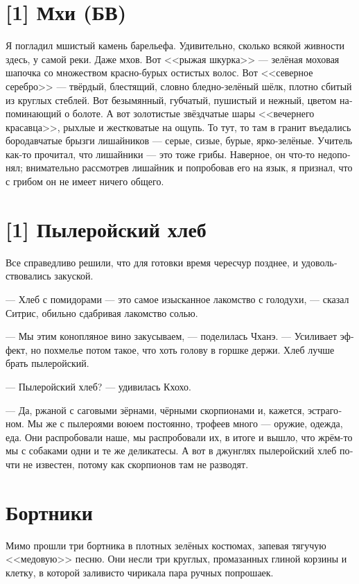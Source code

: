 \documentclass[a4paper,12pt,fleqn]{book}\usepackage{polyglossia}\setdefaultlanguage[babelshorthands=true]{russian}\setotherlanguage{english}\defaultfontfeatures{Ligatures=TeX,Mapping=tex-text}\usepackage{xcolor}\newcommand{\ml}[3]{#2}
\begin{document}
{\section{[1] Мхи (БВ)}

Я погладил мшистый камень барельефа.
Удивительно, сколько всякой живности здесь, у самой реки.
Даже мхов.
Вот <<рыжая шкурка>> --- зелёная моховая шапочка со множеством красно-бурых остистых волос.
Вот <<северное серебро>> --- твёрдый, блестящий, словно бледно-зелёный шёлк, плотно сбитый из круглых стеблей.
Вот безымянный, губчатый, пушистый и нежный, цветом напоминающий о болоте.
А вот золотистые звёздчатые шары <<вечернего красавца>>, рыхлые и жестковатые на ощупь.
То тут, то там в гранит въедались бородавчатые брызги лишайников --- серые, сизые, бурые, ярко-зелёные.
Учитель как-то прочитал, что лишайники --- это тоже грибы.
Наверное, он что-то недопонял;
внимательно рассмотрев лишайник и попробовав его на язык, я признал, что с грибом он не имеет ничего общего.

\section{[1] Пылеройский хлеб}

Все справедливо решили, что для готовки время чересчур позднее, и удовольствовались закуской.

--- Хлеб с помидорами --- это самое изысканное лакомство с голодухи, --- сказал Ситрис, обильно сдабривая лакомство солью.

--- Мы этим конопляное вино закусываем, --- поделилась Чханэ.
--- Усиливает эффект, но похмелье потом такое, что хоть голову в горшке держи.
Хлеб лучше брать пылеройский.

--- Пылеройский хлеб? --- удивилась Кхохо.

--- Да, ржаной с саговыми зёрнами, чёрными скорпионами и, кажется, эстрагоном.
Мы же с пылероями воюем постоянно, трофеев много --- оружие, одежда, еда.
Они распробовали наше, мы распробовали их, в итоге и вышло, что жрём-то мы с собаками одни и те же деликатесы.
А вот в джунглях пылеройский хлеб почти не известен, потому как скорпионов там не разводят.

\section{Бортники}

Мимо прошли три бортника в плотных зелёных костюмах, запевая тягучую <<медовую>> песню.
Они несли три круглых, промазанных глиной корзины и клетку, в которой заливисто чирикала пара ручных попрошаек.

}
\end{document}

